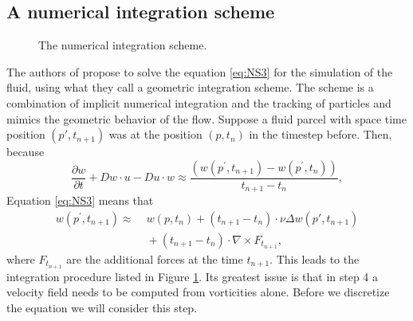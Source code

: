 \subsection{A numerical integration scheme}

\begin{figure}[t]
\begin{center}\end{center}
\caption{The numerical integration scheme.}
\label{fig:fd_numericalIntegration}
\end{figure}


The authors of \cite{simplicialFluids} propose to solve the equation \ref{eq:NS3} for the simulation of the fluid, using what they call a geometric integration scheme. The scheme is a combination of implicit numerical integration and the tracking of particles and mimics the geometric behavior of the flow. Suppose a fluid parcel with space time position $(p',t_{n+1})$ was at the position $(p,t_{n})$ in the timestep before. Then, because 
\[\frac{\partial w}{\partial t} + Dw\cdot u - Du \cdot w \approx  \frac{(w(p^\prime,t_{n+1}) - w(p^\prime,t_{n}))}{t_{n+1}-t_n},\]  
Equation \ref{eq:NS3} means that
\begin{align}w(p^\prime,t_{n+1}) \approx \;& w(p,t_n) + (t_{n+1}-t_n) \cdot \nu \Delta w(p',t_{n+1}) \nonumber \\ &{}+ (t_{n+1}-t_n) \cdot\nabla \times F_{t_{n+1}}\label{eq:vortDiffusion},\end{align}
where $F_{t_{n+1}}$ are the additional forces at the time $t_{n+1}$. This leads to the integration procedure listed in Figure \ref{fig:fd_numericalIntegration}. Its greatest issue is that in step 4 a velocity field needs to be computed from vorticities alone. Before we discretize the equation we will consider this step.

